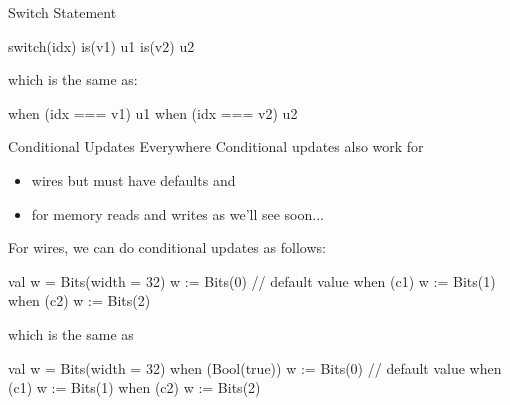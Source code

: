 \documentclass[xcolor=pdflatex,dvipsnames,table]{beamer}
\begin{document}
\begin{frame}[fragile]{Switch Statement}

\begin{scala}
switch(idx) {
  is(v1) { u1 }
  is(v2) { u2 }
}
\end{scala}

which is the same as:

\begin{scala}
when (idx === v1) { u1 }
when (idx === v2) { u2 }
\end{scala}

\end{frame}



\begin{frame}[fragile]{Conditional Updates Everywhere}
Conditional updates also work for 
\begin{itemize}
\item wires but must have defaults and
\item for memory reads and writes as we'll see soon...
\end{itemize}

For wires, we can do conditional updates as follows:

\begin{scala}
val w = Bits(width = 32)
w := Bits(0)                       // default value 
when (c1)         { w := Bits(1) }
when (c2)         { w := Bits(2) }
\end{scala}

\noindent
which is the same as

\begin{scala}
val w = Bits(width = 32)
when (Bool(true)) { w := Bits(0) } // default value
when (c1)         { w := Bits(1) }
when (c2)         { w := Bits(2) }
\end{scala}

\end{frame}
\end{document}
